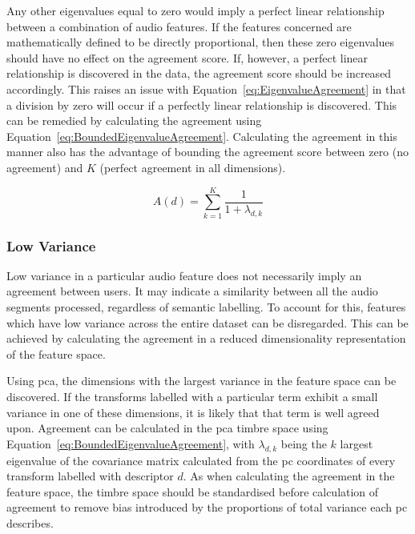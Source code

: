			Any other eigenvalues equal to zero would imply a perfect linear relationship between a combination
			of audio features. If the features concerned are mathematically defined to be directly
			proportional, then these zero eigenvalues should have no effect on the agreement score. If,
			however, a perfect linear relationship is discovered in the data, the agreement score should be
			increased accordingly. This raises an issue with Equation~\ref{eq:EigenvalueAgreement} in that a
			division by zero will occur if a perfectly linear relationship is discovered. This can be remedied
			by calculating the agreement using Equation~\ref{eq:BoundedEigenvalueAgreement}. Calculating the
			agreement in this manner also has the advantage of bounding the agreement score between zero (no
			agreement) and $K$ (perfect agreement in all dimensions).

			\begin{equation}
				A(d) = \sum_{k = 1}^{K} \frac{1}{1 + \lambda_{d,k}}
				\label{eq:BoundedEigenvalueAgreement}
			\end{equation}

		\subsubsection*{Low Variance}
			Low variance in a particular audio feature does not necessarily imply an agreement between users.
			It may indicate a similarity between all the audio segments processed, regardless of semantic
			labelling. To account for this, features which have low variance across the entire dataset can be
			disregarded. This can be achieved by calculating the agreement in a reduced dimensionality
			representation of the feature space.

			Using \acrshort{pca}, the dimensions with the largest variance in the feature space can be
			discovered. If the transforms labelled with a particular term exhibit a small variance in one of
			these dimensions, it is likely that that term is well agreed upon. Agreement can be calculated in
			the \acrshort{pca} timbre space using Equation~\ref{eq:BoundedEigenvalueAgreement}, with
			$\lambda_{d,k}$ being the $k$ largest eigenvalue of the covariance matrix calculated from
			the \acrshort{pc} coordinates of every transform labelled with descriptor $d$. As when calculating
			the agreement in the feature space, the timbre space should be standardised before calculation of
			agreement to remove bias introduced by the proportions of total variance each \acrshort{pc}
			describes.

